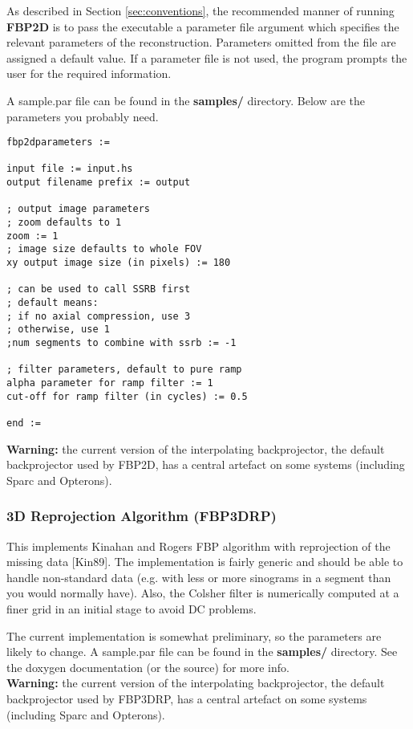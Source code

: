 \documentclass{article}
\begin{document}
As described in Section \ref{sec:conventions}, the recommended manner of running \textbf{FBP2D}  
is to pass the executable a parameter file argument which specifies 
the relevant parameters of the reconstruction. Parameters omitted 
from the file are assigned a default value. If a parameter file 
is not used, the program prompts the user for the required information.


A sample.par file can be found in the \textbf{samples/} directory. 
Below are the parameters you probably need.


\begin{verbatim}
fbp2dparameters :=

input file := input.hs
output filename prefix := output

; output image parameters
; zoom defaults to 1
zoom := 1
; image size defaults to whole FOV
xy output image size (in pixels) := 180

; can be used to call SSRB first
; default means: 
; if no axial compression, use 3 
; otherwise, use 1
;num segments to combine with ssrb := -1

; filter parameters, default to pure ramp
alpha parameter for ramp filter := 1
cut-off for ramp filter (in cycles) := 0.5

end := 
\end{verbatim}

\textbf{Warning:} the current version of the interpolating backprojector, 
the default backprojector used by FBP2D, has a central artefact 
on some systems (including Sparc and Opterons). 


\subsubsection{
3D Reprojection Algorithm (FBP3DRP)}

This implements Kinahan and Rogers FBP algorithm with reprojection 
of the missing data [Kin89]. The implementation is fairly generic 
and should be able to handle non-standard data (e.g. with less 
or more sinograms in a segment than you would normally have). 
Also, the Colsher filter is numerically computed at a finer grid 
in an initial stage to avoid DC problems.


The current implementation is somewhat preliminary, so the parameters 
are likely to change. A sample.par file can be found in the \textbf{samples/} 
directory. See the doxygen documentation (or the source) for 
more info.\\
\textbf{Warning:} the current version of the interpolating backprojector, 
the default backprojector used by FBP3DRP, has a central artefact 
on some systems (including Sparc and Opterons).
\end{document}
